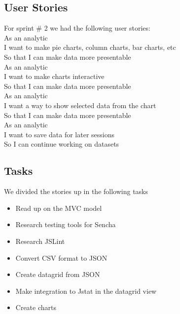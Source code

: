 \subsection{User Stories}
For sprint \# 2 we had the following user stories: \\
As an analytic \\
I want to make pie charts, column charts, bar charts, etc \\
So that I can make data more presentable \\

As an analytic \\
I want to make charts interactive  \\
So that I can make data more presentable \\

As an analytic \\
I want a way to show selected data from the chart \\
So that I can make data more presentable\\

As an analytic \\
I want to save data for later sessions \\
So I can continue working on datasets \\

\subsection{Tasks} %
\label{sub:Tasks}
We divided the stories up in the following tasks
\begin{itemize}
	\item Read up on the MVC model
	\item Research testing tools for Sencha
	\item Research JSLint
	\item Convert CSV format to JSON
	\item Create datagrid from JSON
	\item Make integration to Jstat in the datagrid view
	\item Create charts
\end{itemize}










